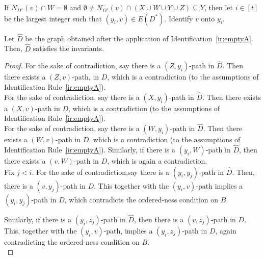 \begin{identification rule}\label{ir:emptyA}
If $N_{D^{\star}}(v) \cap W=\emptyset$ and $\emptyset \neq N_{D^{\star}}^-(v) \cap (X \cup W \cup Y \cup Z) \subseteq Y$, then 
let $i \in [t]$ be the largest integer such that $(y_{i},v) \in E(D^*)$.
Identify $v$ onto $y_{i}$.
\end{identification rule}

\begin{lemma}\label{lem:iremptyA-safe}
Let $\widehat{D}$ be the graph obtained after the application of Identification~\ref{ir:emptyA}. Then, $\widehat{D}$ satisfies the invariants.
\end{lemma}

\begin{proof}
 For the sake of contradiction, say there is a $(Z,y_i)$-path in $\widehat{D}$. 
Then there exists a $(Z,v)$-path, in $D$, which is a contradiction (to the assumptions of Identification Rule~\ref{ir:emptyA}).\\

 For the sake of contradiction, say there is a $(X,y_i)$-path in $\widehat{D}$. 
Then there exists a $(X,v)$-path in $D$, which is a contradiction (to the assumptions of Identification Rule~\ref{ir:emptyA}).\\

 For the sake of contradiction, 
say there is a $(W,y_i)$-path in $\widehat{D}$. 
Then there exists a $(W,v)$-path in $D$, which is a contradiction (to the assumptions of Identification Rule~\ref{ir:emptyA}). Similarly,  if there is a $(y_i,W)$-path in $\widehat{D}$, then there exists a $(v,W)$-path in $D$, which is again a contradiction.\\

Fix $j <i$.
For the sake of contradiction,say there is a $(y_i,y_j)$-path in $\widehat{D}$. Then, there is a $(v,y_j)$-path in $D$. This together with the $(y_i,v)$-path implies a $(y_i,y_j)$-path in $D$, which contradicts the ordered-ness condition on $B$.

Similarly, if there is a $(y_i,z_j)$-path in $\widehat{D}$, then there is a $(v,z_j)$-path in $D$. This, together with the $(y_i,v)$-path, implies a $(y_i,z_j)$-path in $D$, again contradicting the ordered-ness condition on $B$.\\


\end{proof}
